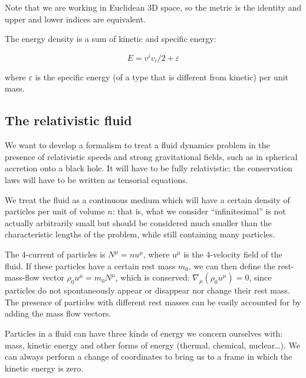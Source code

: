 \documentclass[main.tex]{subfiles}
\begin{document}
Note that we are working in Euclidean 3D space, so the metric is the identity and upper and lower indices are equivalent.

The energy density is a sum of kinetic and specific energy:

\begin{equation}
    E = v^i v_i /2 + \varepsilon
\end{equation}

where $\varepsilon$ is the specific energy (of a type that is different from kinetic) per unit mass.

\subsection{The relativistic fluid}



We want to develop a formalism to treat a fluid dynamics problem in the presence of relativistic speeds and strong gravitational fields, such as in spherical accretion onto a black hole. It will have to be fully relativistic: the conservation laws will have to be written as tensorial equations.

We treat the fluid as a continuous medium which will have a certain density of particles per unit of volume $n$: that is, what we consider ``infinitesimal'' is not actually arbitrarily small but should be considered much smaller than the characteristic lengths of the problem, while still containing many particles.

The 4-current of particles is $N^\mu = n u^\mu$, where \(u^\mu\) is the 4-velocity field of the fluid.
If these particles have a certain rest mass $m_0$, we can then define the rest-mass-flow vector $\rho_0 u^\mu = m_0 N^\mu$, which is conserved: $\nabla_\mu(\rho_0 u^\mu) = 0$, since particles do not spontaneously appear or disappear nor change their rest mass.
The presence of particles with different rest masses can be easily accounted for by adding the mass flow vectors.

Particles in a fluid can have three kinds of energy we concern ourselves with: mass, kinetic energy and other forms of energy (thermal, chemical, nuclear\dots).
We can always perform a change of coordinates to bring us to a frame in which the kinetic energy is zero.
\end{document}
